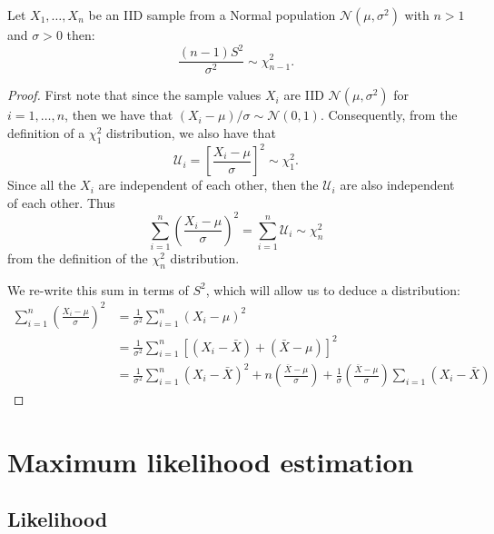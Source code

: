 \documentclass[10pt, a4paper]{article}
\begin{document}
\begin{proposition}
    Let $X_1, \dotsc, X_n$ be an IID sample from a Normal population $\mathcal{N}(\mu, \sigma ^ 2)$ with $n > 1$ and $\sigma > 0$ then:
    \[
    \frac{(n - 1)S ^ 2}{\sigma ^ 2} \sim \chi_{n - 1}^{2}.
    \]

    \begin{proof}
        First note that since the sample values $X_i$ are IID $\mathcal{N}(\mu, \sigma ^ 2)$ for $i = 1, \dotsc, n$,
        then we have that $(X_i - \mu) / \sigma \sim \mathcal{N}(0, 1)$.
        Consequently,
        from the definition of a $\chi_{1}^{2}$ distribution,
        we also have that
        \[
        \mathcal{U}_i = \left[\frac{X_i - \mu}{\sigma}\right] ^ 2 \sim \chi_{1}^{2}.
        \]
        Since all the $X_i$ are independent of each other,
        then the $\mathcal{U}_i$ are also independent of each other.
        Thus
        \[
        \sum_{i = 1}^{n}\left(\frac{X_i - \mu}{\sigma}\right) ^ 2 = \sum_{i = 1}^{n}\mathcal{U}_i \sim \chi_{n}^{2}
        \]
        from the definition of the $\chi_{n}^{2}$ distribution.

        We re-write this sum in terms of $S ^ 2$,
        which will allow us to deduce a distribution:
        \begin{align*}
            \sum_{i = 1}^{n}\left(\frac{X_i - \mu}{\sigma}\right) ^ 2 &= \frac{1}{\sigma ^ 2}\sum_{i = 1}^{n}(X_i - \mu) ^ 2 \\
            &= \frac{1}{\sigma ^ 2}\sum_{i = 1}^{n}\left[(X_i - \bar{X}) + (\bar{X} - \mu)\right] ^ 2 \\
            &= \frac{1}{\sigma ^ 2}\sum_{i = 1}^{n}(X_i - \bar{X}) ^ 2 + n\left(\frac{\bar{X} - \mu}{\sigma}\right) + \frac{1}{\sigma}\left(\frac{\bar{X} - \mu}{\sigma}\right)\sum_{i = 1}(X_i - \bar{X})
        \end{align*}
    \end{proof}
\end{proposition}

\newpage

\section{Maximum likelihood estimation}

\subsection{Likelihood}
\end{document}
